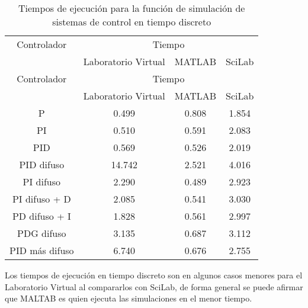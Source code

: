         {\setlength\LTleft{0pt}
        \setlength\LTright{0pt}
        \centering
        \renewcommand{\arraystretch}{0.80}
        \begin{longtable}{c @{\extracolsep{\fill}} ccc}
            \caption[Tiempos de ejecución para la función de simulación de sistemas de control en tiempo discreto]{Tiempos de ejecución para la función de simulación de sistemas de control en tiempo discreto}
            \label{tab:timeD} \\
            \toprule
            Controlador   &        \multicolumn{3}{c}{Tiempo}        \\ \cmidrule{1-1} \cmidrule{2-4}
                        &   Laboratorio Virtual  & MATLAB & SciLab  \\ \cmidrule{2-2} \cmidrule{3-3} \cmidrule{4-4}
            \endfirsthead
            \toprule
            Controlador   &        \multicolumn{3}{c}{Tiempo}        \\ \cmidrule{1-1} \cmidrule{2-4}
                        &   Laboratorio Virtual  & MATLAB & SciLab  \\ \cmidrule{2-2} \cmidrule{3-3} \cmidrule{4-4}
            \endhead
            \bottomrule
            \endfoot
            P              & 0.499  & 0.808 & 1.854 \\
            PI             & 0.510  & 0.591 & 2.083 \\
            PID            & 0.569  & 0.526 & 2.019 \\
            PID difuso     & 14.742 & 2.521 & 4.016 \\
            PI difuso      & 2.290  & 0.489 & 2.923 \\
            PI difuso + D  & 2.085  & 0.541 & 3.030 \\
            PD difuso + I  & 1.828  & 0.561 & 2.997 \\
            PDG difuso     & 3.135  & 0.687 & 3.112 \\
            PID más difuso & 6.740  & 0.676 & 2.755 \\
        \end{longtable}}

        Los tiempos de ejecución en tiempo discreto son en algunos casos menores para el Laboratorio Virtual al compararlos con SciLab, de forma general se puede afirmar que MALTAB es quien ejecuta las simulaciones en el menor tiempo.
